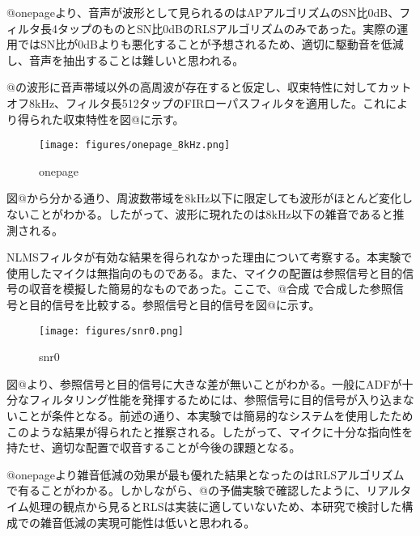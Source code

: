 @onepageより、音声が波形として見られるのはAPアルゴリズムのSN比0dB、フィルタ長4タップのものとSN比0dBのRLSアルゴリズムのみであった。実際の運用ではSN比が0dBよりも悪化することが予想されるため、適切に駆動音を低減し、音声を抽出することは難しいと思われる。

@の波形に音声帯域以外の高周波が存在すると仮定し、収束特性に対してカットオフ8kHz、フィルタ長512タップのFIRローパスフィルタを適用した。これにより得られた収束特性を図@に示す。

\begin{figure}[H]
\centering
\texttt{[image: figures/onepage\_8kHz.png]}
\caption{onepage}
\end{figure}

図@から分かる通り、周波数帯域を8kHz以下に限定しても波形がほとんど変化しないことがわかる。したがって、波形に現れたのは8kHz以下の雑音であると推測される。

NLMSフィルタが有効な結果を得られなかった理由について考察する。本実験で使用したマイクは無指向のものである。また、マイクの配置は参照信号と目的信号の収音を模擬した簡易的なものであった。ここで、@合成
で合成した参照信号と目的信号を比較する。参照信号と目的信号を図@に示す。

\begin{figure}[H]
\centering
\texttt{[image: figures/snr0.png]}
\caption{snr0}
\end{figure}

図@より、参照信号と目的信号に大きな差が無いことがわかる。一般にADFが十分なフィルタリング性能を発揮するためには、参照信号に目的信号が入り込まないことが条件となる。前述の通り、本実験では簡易的なシステムを使用したためこのような結果が得られたと推察される。したがって、マイクに十分な指向性を持たせ、適切な配置で収音することが今後の課題となる。

@onepageより雑音低減の効果が最も優れた結果となったのはRLSアルゴリズムで有ることがわかる。しかしながら、@の予備実験で確認したように、リアルタイム処理の観点から見るとRLSは実装に適していないため、本研究で検討した構成での雑音低減の実現可能性は低いと思われる。
